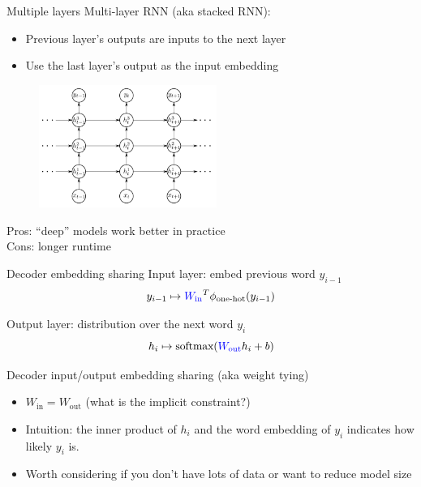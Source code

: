 \documentclass[usenames,dvipsnames,notes]{beamer}
\begin{document}
\begin{frame}
    {Multiple layers}
    Multi-layer RNN (aka stacked RNN):\\
    \begin{itemize}
        \item Previous layer's outputs are inputs to the next layer 
        \item Use the last layer's output as the input embedding
    \end{itemize}
    \vspace{-1em}
    \begin{figure}
        \includegraphics[height=4cm]{figures/stacked-rnn}
    \end{figure}
    \vspace{-1em}
    Pros: ``deep'' models work better in practice\\
    Cons: longer runtime
\end{frame}

\begin{frame}
    {Decoder embedding sharing}
    Input layer: embed previous word $y_{i-1}$
    $$
    y_{i-1} \mapsto {\color{blue}W_{\text{in}}}^T\phi_{\text{one-hot}}(y_{i-1})
    $$

    Output layer: distribution over the next word $y_i$
    $$
    h_i \mapsto \text{softmax}({\color{blue}W_{\text{out}}}h_i + b)
    $$

    Decoder input/output embedding sharing (aka weight tying)\\
    \begin{itemize}
        \item $W_{\text{in}} = W_{\text{out}}$ (what is the implicit constraint?)
        \item Intuition: the inner product of $h_i$ and the word embedding of $y_i$ indicates how likely $y_i$ is.
        \item Worth considering if you don't have lots of data or want to reduce model size 
    \end{itemize}
\end{frame}
\end{document}
